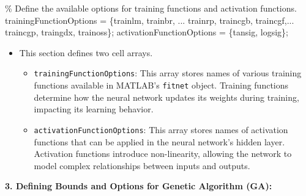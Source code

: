 \documentclass[
  super,
  review,
  3p]{elsarticle}
\newenvironment{Shaded}{\begin{snugshade}}{\end{snugshade}}
\newcommand{\CommentTok}[1]{\textcolor[rgb]{0.37,0.37,0.37}{#1}}
\newcommand{\NormalTok}[1]{\textcolor[rgb]{0.00,0.23,0.31}{#1}}
\newcommand{\OperatorTok}[1]{\textcolor[rgb]{0.37,0.37,0.37}{#1}}
\newcommand{\SpecialStringTok}[1]{\textcolor[rgb]{0.13,0.47,0.30}{#1}}
\newcommand{\VariableTok}[1]{\textcolor[rgb]{0.07,0.07,0.07}{#1}}
\providecommand{\tightlist}{%
  \setlength{\itemsep}{0pt}\setlength{\parskip}{0pt}}\usepackage{longtable,booktabs,array}
\begin{document}
\begin{Shaded}
\begin{Highlighting}[]
\CommentTok{\% Define the available options for training functions and activation functions.}
    \VariableTok{trainingFunctionOptions} \OperatorTok{=}\NormalTok{ \{}\SpecialStringTok{\textquotesingle{}trainlm\textquotesingle{}}\OperatorTok{,} \SpecialStringTok{\textquotesingle{}trainbr\textquotesingle{}}\OperatorTok{,} \OperatorTok{...}
    \SpecialStringTok{\textquotesingle{}trainrp\textquotesingle{}}\OperatorTok{,} \SpecialStringTok{\textquotesingle{}traincgb\textquotesingle{}}\OperatorTok{,} \SpecialStringTok{\textquotesingle{}traincgf\textquotesingle{}}\OperatorTok{,...}
     \SpecialStringTok{\textquotesingle{}traincgp\textquotesingle{}}\OperatorTok{,} \SpecialStringTok{\textquotesingle{}traingdx\textquotesingle{}}\OperatorTok{,} \SpecialStringTok{\textquotesingle{}trainoss\textquotesingle{}}\NormalTok{\}}\OperatorTok{;}
    \VariableTok{activationFunctionOptions} \OperatorTok{=}\NormalTok{ \{}\SpecialStringTok{\textquotesingle{}tansig\textquotesingle{}}\OperatorTok{,} \SpecialStringTok{\textquotesingle{}logsig\textquotesingle{}}\NormalTok{\}}\OperatorTok{;}
\end{Highlighting}
\end{Shaded}

\begin{itemize}
\tightlist
\item
  This section defines two cell arrays.

  \begin{itemize}
  \tightlist
  \item
    \texttt{trainingFunctionOptions}: This array stores names of various
    training functions available in MATLAB's \texttt{fitnet} object.
    Training functions determine how the neural network updates its
    weights during training, impacting its learning behavior.
  \item
    \texttt{activationFunctionOptions}: This array stores names of
    activation functions that can be applied in the neural network's
    hidden layer. Activation functions introduce non-linearity, allowing
    the network to model complex relationships between inputs and
    outputs.
  \end{itemize}
\end{itemize}

\textbf{3. Defining Bounds and Options for Genetic Algorithm (GA):}
\end{document}
